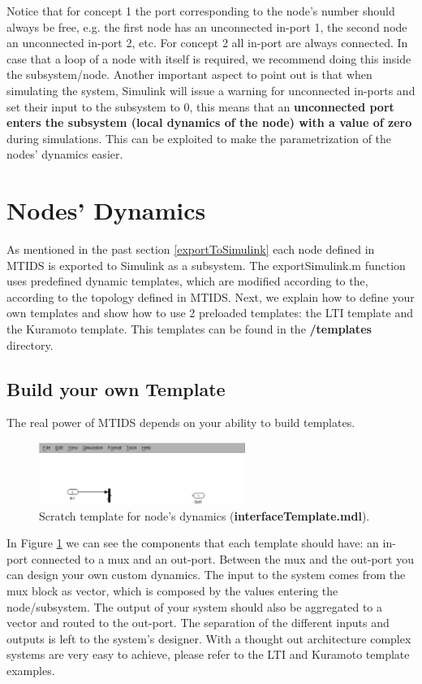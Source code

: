 \documentclass[a4paper,twoside, openright,12pt]{report}
\begin{document}
Notice that for concept 1 the port corresponding to the node's number
should always be free, e.g. the first node has an unconnected in-port 1, the second node an unconnected in-port 2, etc. For concept 2 all in-port are always connected. 
In case that a loop of a node with itself is required, we recommend doing this inside the subsystem/node. 
Another important aspect to point out is that when simulating the system, Simulink will issue a warning for unconnected in-ports and set their input to the subsystem to 0, this means 
that an \textbf{unconnected port enters the subsystem (local dynamics of the node) with a value of zero} during simulations. This can be exploited to 
make the parametrization of the nodes' dynamics easier. 

\section{Nodes' Dynamics}

As mentioned in the past section \ref{exportToSimulink} each node defined in MTIDS is exported to Simulink as a subsystem. The exportSimulink.m function 
uses predefined dynamic templates, which are modified according to the, according to the topology defined in MTIDS. Next, we explain how to define your own templates and
show how to use 2 preloaded templates: the LTI template and the Kuramoto template. This templates can be found in the \textbf{/templates} directory. 


\subsection{Build your own Template} \label{nodeTemplate}
The real power of MTIDS depends on your ability to build templates. 
\\
\begin{figure}[htb]
\centering
\includegraphics[width=0.6\textwidth]{pics/screenBuildTemplate.eps}
\caption[MTIDS node's scratch Template]{Scratch template for node's dynamics (\textbf{interfaceTemplate.mdl}). }
\label{templateFig}
\end{figure}

In Figure \ref{templateFig} we can see the components that each template should have: an in-port connected to a mux and an out-port.
Between the mux and the out-port you can design your own custom dynamics. The input to the system comes from the mux block as vector, which is composed by the values
entering the node/subsystem. The output of your system should also be aggregated to a vector and routed to the out-port. The separation of the different inputs and outputs 
is left to the system's designer. With a thought out architecture complex systems are very easy to achieve, please refer to the LTI and Kuramoto template examples.  
\\
\end{document}

